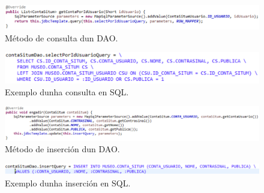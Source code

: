 \begin{figure}[tbh] 
	\begin{center}
		\includegraphics[width=1\textwidth]{figures/codigo/daoConsulta}
		\caption{Método de consulta dun DAO.}
		\label{fig:daoConsulta}
	\end{center}
\end{figure}

\begin{figure}[tbh] 
	\begin{center}
		\includegraphics[width=1\textwidth]{figures/codigo/daoConsultaSQL}
		\caption{Exemplo dunha consulta en SQL.}
		\label{fig:daoConsultaSQL}
	\end{center}
\end{figure}

\begin{figure}[tbh] 
	\begin{center}
		\includegraphics[width=1\textwidth]{figures/codigo/daoInsert}
		\caption{Método de inserción dun DAO.}
		\label{fig:daoInsert}
	\end{center}
\end{figure}

\begin{figure}[tbh] 
	\begin{center}
		\includegraphics[width=1\textwidth]{figures/codigo/daoInsertSQL}
		\caption{Exemplo dunha inserción en SQL.}
		\label{fig:daoInsertSQL}
	\end{center}
\end{figure}










